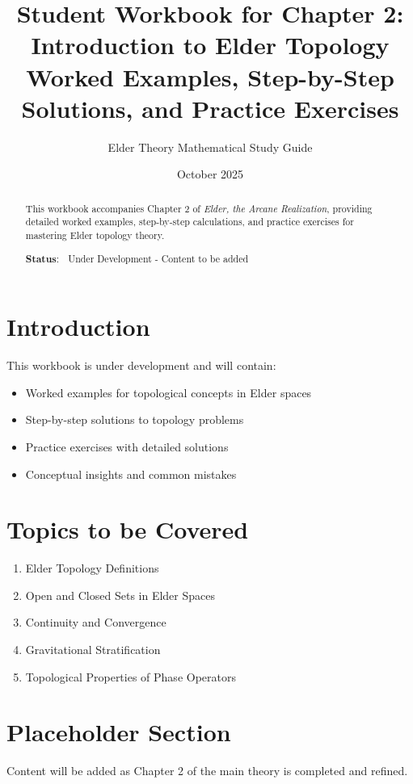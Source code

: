 \documentclass[12pt,a4paper]{article}
\title{\textbf{Student Workbook for Chapter 2:}\\
\Large{Introduction to Elder Topology}\\
\large{Worked Examples, Step-by-Step Solutions, and Practice Exercises}}
\author{Elder Theory Mathematical Study Guide}
\date{October 2025}
\theoremstyle{definition}
\theoremstyle{remark}
\begin{document}
\maketitle

\begin{abstract}
This workbook accompanies Chapter 2 of \textit{Elder, the Arcane Realization}, providing detailed worked examples, step-by-step calculations, and practice exercises for mastering Elder topology theory.

\textbf{Status}: 🚧 Under Development - Content to be added
\end{abstract}

\tableofcontents
\newpage

\section{Introduction}

This workbook is under development and will contain:

\begin{itemize}
    \item Worked examples for topological concepts in Elder spaces
    \item Step-by-step solutions to topology problems
    \item Practice exercises with detailed solutions
    \item Conceptual insights and common mistakes
\end{itemize}

\section{Topics to be Covered}

\begin{enumerate}
    \item Elder Topology Definitions
    \item Open and Closed Sets in Elder Spaces
    \item Continuity and Convergence
    \item Gravitational Stratification
    \item Topological Properties of Phase Operators
\end{enumerate}

\section{Placeholder Section}

Content will be added as Chapter 2 of the main theory is completed and refined.
\end{document}
